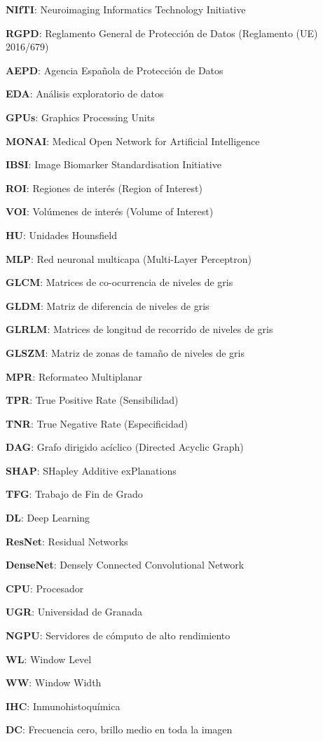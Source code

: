 \begin{description}
  \item \textbf{NIfTI}: Neuroimaging Informatics Technology Initiative
  \item \textbf{RGPD}: Reglamento General de Protección de Datos (Reglamento (UE) 2016/679)
  \item \textbf{AEPD}: Agencia Española de Protección de Datos
  \item \textbf{EDA}: Análisis exploratorio de datos
  \item \textbf{GPUs}: Graphics Processing Units
  \item \textbf{MONAI}: Medical Open Network for Artificial Intelligence
  \item \textbf{IBSI}: Image Biomarker Standardisation Initiative
  \item \textbf{ROI}: Regiones de interés (Region of Interest)
  \item \textbf{VOI}: Volúmenes de interés (Volume of Interest)
  \item \textbf{HU}: Unidades Hounsfield
  \item \textbf{MLP}: Red neuronal multicapa (Multi-Layer Perceptron)
  \item \textbf{GLCM}: Matrices de co-ocurrencia de niveles de gris
  \item \textbf{GLDM}: Matriz de diferencia de niveles de gris
  \item \textbf{GLRLM}: Matrices de longitud de recorrido de niveles de gris
  \item \textbf{GLSZM}: Matriz de zonas de tamaño de niveles de gris
  \item \textbf{MPR}: Reformateo Multiplanar
  \item \textbf{TPR}: True Positive Rate (Sensibilidad)
  \item \textbf{TNR}: True Negative Rate (Especificidad)
  \item \textbf{DAG}: Grafo dirigido acíclico (Directed Acyclic Graph)
  \item \textbf{SHAP}: SHapley Additive exPlanations
  \item \textbf{TFG}: Trabajo de Fin de Grado
  \item \textbf{DL}: Deep Learning
  \item \textbf{ResNet}: Residual Networks
  \item \textbf{DenseNet}: Densely Connected Convolutional Network
  \item \textbf{CPU}: Procesador
  \item \textbf{UGR}: Universidad de Granada
  \item \textbf{NGPU}: Servidores de cómputo de alto rendimiento
  \item \textbf{WL}: Window Level
  \item \textbf{WW}: Window Width
  \item \textbf{IHC}: Inmunohistoquímica
  \item \textbf{DC}: Frecuencia cero, brillo medio en toda la imagen
\end{description}

\endinput

